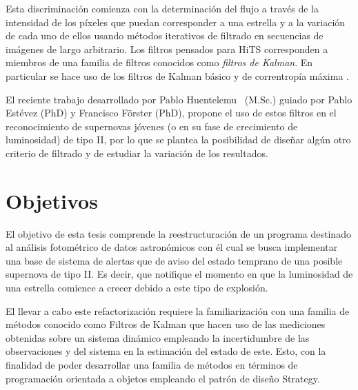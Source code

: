 Esta discriminaci\'on comienza con la determinaci\'on del flujo a trav\'es de la intensidad de los p\'ixeles que puedan corresponder a una estrella y a la variaci\'on de cada uno de ellos usando m\'etodos iterativos de filtrado en secuencias de im\'agenes de largo arbitrario. Los filtros pensados para HiTS corresponden a miembros de una familia de filtros conocidos como \textit{filtros de Kalman}. En particular se hace uso de los filtros de Kalman b\'asico \cite{kalman} y de correntrop\'ia m\'axima \cite{chen}.
\bigskip


El reciente trabajo desarrollado por Pablo Huentelemu~\cite{huentelemu} (M.Sc.) guiado por Pablo Est\'evez  (PhD) y Francisco Förster (PhD), propone el uso de estos filtros en el reconocimiento de supernovas j\'ovenes (o en su fase de crecimiento de luminosidad) de tipo II, por lo que se plantea la posibilidad de dise\~nar alg\'un otro criterio de filtrado y de estudiar la variaci\'on de los resultados.
\bigskip



\section{Objetivos}
El objetivo de esta tesis comprende la reestructuraci\'on de un programa destinado al an\'alisis fotom\'etrico de datos astron\'omicos con \'el cual se busca implementar una base de sistema de alertas que de aviso del estado temprano de una posible supernova de tipo II. Es decir, que notifique el momento en que la luminosidad de una estrella comience a crecer debido a este tipo de explosi\'on. 
\bigskip

El llevar a cabo este refactorizaci\'on requiere la familiarizaci\'on con una familia de m\'etodos conocido como Filtros de Kalman que hacen uso de las mediciones obtenidas sobre un sistema din\'amico empleando la incertidumbre de las observaciones y del sistema en la estimaci\'on del estado de este. Esto, con la finalidad de poder desarrollar una familia de m\'etodos en t\'erminos de programaci\'on orientada a objetos empleando el patr\'on de dise\~no Strategy.
\bigskip

